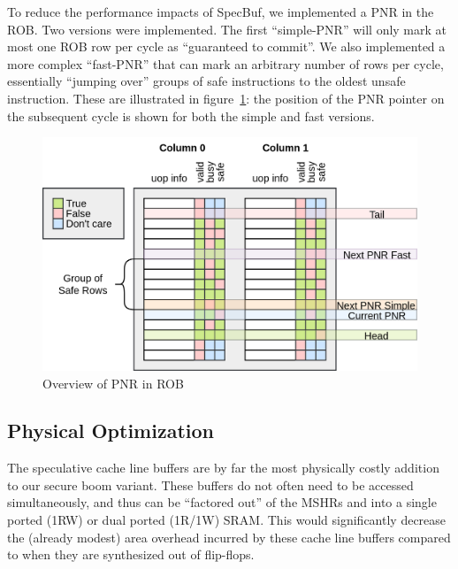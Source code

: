 To reduce the performance impacts of SpecBuf, we implemented a PNR in the ROB. Two versions were implemented. The first ``simple-PNR'' will only mark at most one ROB row per cycle as ``guaranteed to commit''. We also implemented a more complex ``fast-PNR'' that can mark an arbitrary number of rows per cycle, essentially ``jumping over'' groups of safe instructions to the oldest unsafe instruction. These are illustrated in figure~\ref{PNR}: the position of the PNR pointer on the subsequent cycle is shown for both the simple and fast versions.

\begin{figure}[h]
  \begin{center}\includegraphics[scale=0.17]{rob_pnr.png}\end{center}
  \caption{Overview of PNR in ROB}
  \label{PNR}
\end{figure}

\subsection{Physical Optimization}
The speculative cache line buffers are by far the most physically costly addition to our secure boom variant. These buffers do not often need to be accessed simultaneously, and thus can be ``factored out'' of the MSHRs and into a single ported (1RW) or dual ported (1R/1W) SRAM. This would significantly decrease the (already modest) area overhead incurred by these cache line buffers compared to when they are synthesized out of flip-flops.

